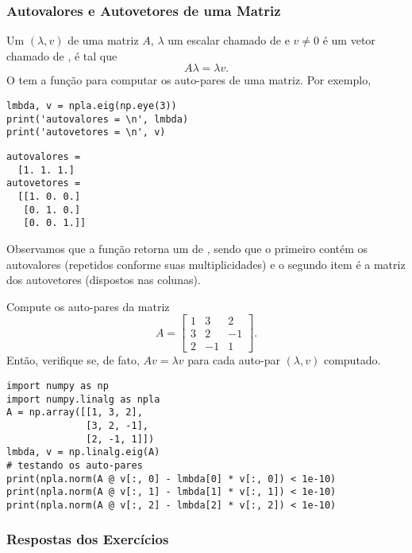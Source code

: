 \subsubsection{Autovalores e Autovetores de uma Matriz}

Um  $(\lambda, v)$ de uma matriz $A$, $\lambda$ um escalar chamado de  e $v\neq 0$ é um vetor chamado de , é tal que
\begin{equation}
  A\lambda = \lambda v.
\end{equation}
O {\PYTHONnumpy} tem a função \hl{\PYTHONnumpyDOTlinalgDOTeig} para computar os auto-pares de uma matriz. Por exemplo,

\begin{lstlisting}
lmbda, v = npla.eig(np.eye(3))
print('autovalores = \n', lmbda)
print('autovetores = \n', v)
\end{lstlisting}

\begin{verbatim}
autovalores = 
  [1. 1. 1.]
autovetores = 
  [[1. 0. 0.]
   [0. 1. 0.]
   [0. 0. 1.]]
\end{verbatim}

Observamos que a função retorna um {\PYTHONtuple} de {\PYTHONnumpyDOTarrays}, sendo que o primeiro contém os autovalores (repetidos conforme suas multiplicidades) e o segundo item é a matriz dos autovetores (dispostos nas colunas).

\begin{exer}
  Compute os auto-pares da matriz
  \begin{equation}
    A =
    \begin{bmatrix}
      1 & 3 & 2\\
      3 & 2 & -1\\
      2 & -1 & 1
    \end{bmatrix}.
  \end{equation}
  Então, verifique se, de fato, $Av = \lambda v$ para cada auto-par $(\lambda, v)$ computado.
\end{exer}
\begin{resp}
  
\begin{lstlisting}
import numpy as np
import numpy.linalg as npla
A = np.array([[1, 3, 2],
              [3, 2, -1],
              [2, -1, 1]])
lmbda, v = np.linalg.eig(A)
# testando os auto-pares
print(npla.norm(A @ v[:, 0] - lmbda[0] * v[:, 0]) < 1e-10)
print(npla.norm(A @ v[:, 1] - lmbda[1] * v[:, 1]) < 1e-10)
print(npla.norm(A @ v[:, 2] - lmbda[2] * v[:, 2]) < 1e-10)
\end{lstlisting}
\end{resp}

\ifisbook 
\subsubsection*{Respostas dos Exercícios}
\shipoutAnswer
\fi
